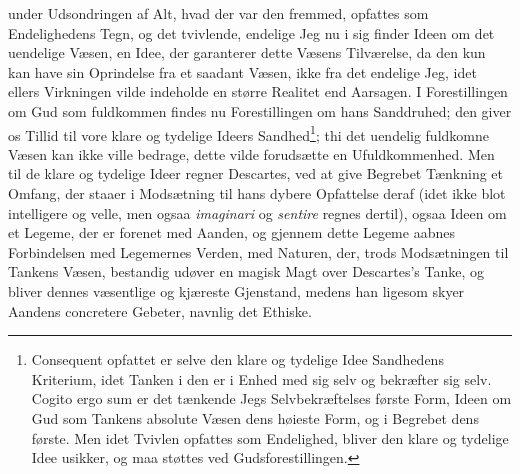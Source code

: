 \documentclass[12pt,a4paper]{book}
\newcommand{\opage}[1]{\marginnote{\footnotesize\textit{[#1]}}}
\begin{document}
under Udsondringen af Alt, hvad der var den fremmed, opfattes som
Endelighedens Tegn, og det tvivlende, endelige Jeg nu i sig finder Ideen
om det uendelige Væsen, en Idee, der garanterer dette Væsens Tilværelse,
da den kun kan have sin Oprindelse fra et saadant Væsen, ikke fra det
endelige Jeg, idet ellers Virkningen
\opage{19} \setcounter{footnote}{0}%
vilde indeholde en større Realitet end Aarsagen. I Forestillingen om Gud
som fuldkommen findes nu Forestillingen om hans Sanddruhed; den giver os
Tillid til vore klare og tydelige Ideers
Sandhed\footnote{Consequent opfattet er selve den klare og tydelige Idee
Sandhedens Kriterium, idet Tanken i den er i Enhed med sig selv og
bekræfter sig selv. Cogito ergo sum er det tænkende Jegs
Selvbekræftelses første Form, Ideen om Gud som Tankens absolute Væsen
dens høieste Form, og i Begrebet dens første. Men idet Tvivlen opfattes
som Endelighed, bliver den klare og tydelige Idee usikker, og maa støttes
ved Gudsforestillingen.}; thi det uendelig fuldkomne Væsen kan ikke ville
bedrage, dette vilde forudsætte en Ufuldkommenhed. Men til de klare og
tydelige Ideer regner Descartes, ved at give Begrebet Tænkning et
Omfang, der staaer i Modsætning til hans dybere Opfattelse deraf (idet
ikke blot intelligere og velle, men ogsaa \emph{imaginari} og
\emph{sentire} regnes dertil), ogsaa Ideen om et Legeme, der er forenet
med Aanden, og gjennem dette Legeme aabnes Forbindelsen med Legemernes
Verden, med Naturen, der, trods Modsætningen til Tankens Væsen,
bestandig udøver en magisk Magt over Descartes's Tanke, og bliver dennes
væsentlige og kjæreste Gjenstand, medens han ligesom skyer Aandens
concretere Gebeter, navnlig det Ethiske.
\end{document}
